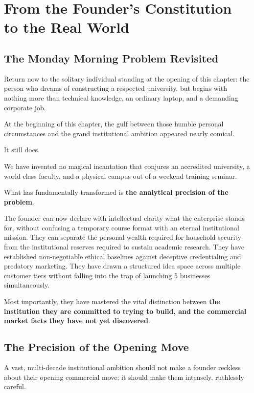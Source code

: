\section{From the Founder's Constitution to the Real World}

\subsection{The Monday Morning Problem Revisited}

Return now to the solitary individual standing at the opening of this chapter: the person who dreams of constructing a respected university, but begins with nothing more than technical knowledge, an ordinary laptop, and a demanding corporate job.

At the beginning of this chapter, the gulf between those humble personal circumstances and the grand institutional ambition appeared nearly comical.

It still does.

We have invented no magical incantation that conjures an accredited university, a world-class faculty, and a physical campus out of a weekend training seminar.

What has fundamentally transformed is \textbf{the analytical precision of the problem}.

The founder can now declare with intellectual clarity what the enterprise stands for, without confusing a temporary course format with an eternal institutional mission. They can separate the personal wealth required for household security from the institutional reserves required to sustain academic research. They have established non-negotiable ethical baselines against deceptive credentialing and predatory marketing. They have drawn a structured idea space across multiple customer tiers without falling into the trap of launching 5 businesses simultaneously.

Most importantly, they have mastered the vital distinction between \textbf{the institution they are committed to trying to build, and the commercial market facts they have not yet discovered}.

\subsection{The Precision of the Opening Move}

A vast, multi-decade institutional ambition should not make a founder reckless about their opening commercial move; it should make them intensely, ruthlessly careful.

